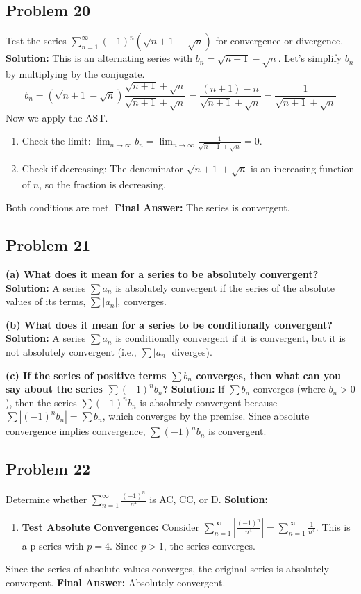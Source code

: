 \documentclass{article}
\begin{document}
\subsection*{Problem 20}
Test the series $\sum_{n=1}^{\infty} (-1)^n (\sqrt{n+1} - \sqrt{n})$ for convergence or divergence.
\textbf{Solution:} This is an alternating series with $b_n = \sqrt{n+1} - \sqrt{n}$. Let's simplify $b_n$ by multiplying by the conjugate.
\[ b_n = (\sqrt{n+1} - \sqrt{n}) \frac{\sqrt{n+1} + \sqrt{n}}{\sqrt{n+1} + \sqrt{n}} = \frac{(n+1)-n}{\sqrt{n+1}+\sqrt{n}} = \frac{1}{\sqrt{n+1}+\sqrt{n}} \]
Now we apply the AST.
\begin{enumerate}
    \item Check the limit: $\lim_{n \to \infty} b_n = \lim_{n \to \infty} \frac{1}{\sqrt{n+1}+\sqrt{n}} = 0$.
    \item Check if decreasing: The denominator $\sqrt{n+1}+\sqrt{n}$ is an increasing function of $n$, so the fraction is decreasing.
\end{enumerate}
Both conditions are met.
\textbf{Final Answer:} The series is convergent.

\subsection*{Problem 21}
\textbf{(a) What does it mean for a series to be absolutely convergent?}
\textbf{Solution:} A series $\sum a_n$ is absolutely convergent if the series of the absolute values of its terms, $\sum |a_n|$, converges.

\textbf{(b) What does it mean for a series to be conditionally convergent?}
\textbf{Solution:} A series $\sum a_n$ is conditionally convergent if it is convergent, but it is not absolutely convergent (i.e., $\sum |a_n|$ diverges).

\textbf{(c) If the series of positive terms $\sum b_n$ converges, then what can you say about the series $\sum (-1)^n b_n$?}
\textbf{Solution:} If $\sum b_n$ converges (where $b_n > 0$), then the series $\sum (-1)^n b_n$ is absolutely convergent because $\sum |(-1)^n b_n| = \sum b_n$, which converges by the premise. Since absolute convergence implies convergence, $\sum (-1)^n b_n$ is convergent.

\subsection*{Problem 22}
Determine whether $\sum_{n=1}^{\infty} \frac{(-1)^n}{n^4}$ is AC, CC, or D.
\textbf{Solution:}
\begin{enumerate}
    \item \textbf{Test Absolute Convergence:} Consider $\sum_{n=1}^{\infty} \left| \frac{(-1)^n}{n^4} \right| = \sum_{n=1}^{\infty} \frac{1}{n^4}$. This is a p-series with $p=4$. Since $p > 1$, the series converges.
\end{enumerate}
Since the series of absolute values converges, the original series is absolutely convergent.
\textbf{Final Answer:} Absolutely convergent.
\end{document}
